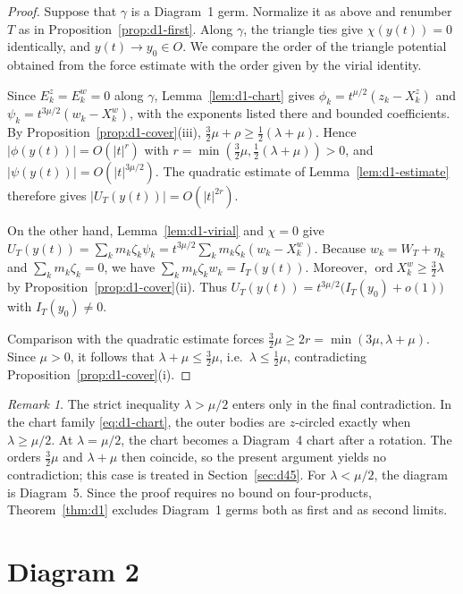 \documentclass[11pt]{amsart}
\theoremstyle{definition}
\theoremstyle{remark}
\newtheorem{remark}[theorem]{Remark}
\newcommand{\ord}{\operatorname{ord}}
\begin{document}
\begin{proof}
{Suppose that $\gamma$ is a Diagram~1 germ.  Normalize it as above and
renumber $T$ as in Proposition~\ref{prop:d1-first}.  Along $\gamma$, the triangle ties give $\chi(y(t))=0$
identically, and $y(t)\to y_0\in O$.  We compare the order of the triangle potential obtained
from the force estimate with the order given by the virial identity.

Since $E^z_k=E^w_k=0$ along $\gamma$, Lemma~\ref{lem:d1-chart} gives
$\phi_k=t^{\mu/2}(z_k-X^z_k)$ and $\psi_k=t^{3\mu/2}(w_k-X^w_k)$, with the exponents listed
there and bounded coefficients.  By Proposition~\ref{prop:d1-cover}(iii),
$\frac32\mu+\rho\ge\frac12(\lambda+\mu)$.  Hence $|\phi(y(t))|=O(|t|^r)$ with
$r=\min(\frac32\mu,\frac12(\lambda+\mu))>0$, and $|\psi(y(t))|=O(|t|^{3\mu/2})$.
The quadratic estimate of Lemma~\ref{lem:d1-estimate} therefore gives
$|U_T(y(t))|=O(|t|^{2r})$.

On the other hand, Lemma~\ref{lem:d1-virial} and $\chi=0$ give
$U_T(y(t))=\sum_km_k\zeta_k\psi_k=t^{3\mu/2}\sum_km_k\zeta_k(w_k-X^w_k)$.
Because $w_k=W_T+\eta_k$ and $\sum_km_k\zeta_k=0$, we have
$\sum_km_k\zeta_kw_k=I_T(y(t))$.  Moreover,
$\ord X^w_k\ge\frac32\lambda$ by Proposition~\ref{prop:d1-cover}(ii).  Thus
$U_T(y(t))=t^{3\mu/2}\big(I_T(y_0)+o(1)\big)$ with $I_T(y_0)\ne0$.

Comparison with the quadratic estimate forces
$\frac32\mu\ge2r=\min(3\mu,\lambda+\mu)$.  Since $\mu>0$, it follows that
$\lambda+\mu\le\frac32\mu$, i.e.\ $\lambda\le\frac12\mu$, contradicting
Proposition~\ref{prop:d1-cover}(i).}
\end{proof}

\begin{remark}\label{rem:d1-wall}
{The strict inequality $\lambda>\mu/2$ enters only in the final
contradiction.  In the chart family \eqref{eq:d1-chart}, the outer bodies are $z$-circled
exactly when $\lambda\ge\mu/2$.  At $\lambda=\mu/2$, the chart becomes a Diagram~4 chart after
a rotation.  The orders $\frac32\mu$ and $\lambda+\mu$ then coincide, so the present
argument yields no contradiction; this case is treated in Section~\ref{sec:d45}.
For $\lambda<\mu/2$, the diagram is Diagram~5.  Since the proof requires no bound on
four-products, Theorem~\ref{thm:d1} excludes Diagram~1 germs both as first and as second
limits.}
\end{remark}



\section{Diagram 2}\label{sec:d2}
\end{document}

